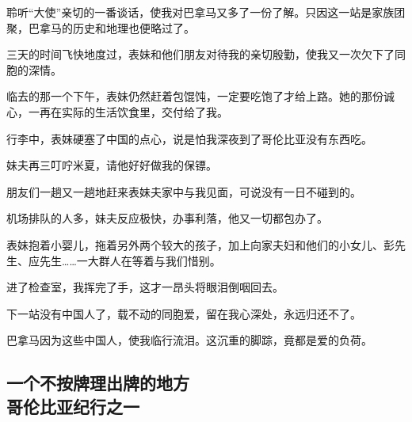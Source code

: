 \par 聆听“大使”亲切的一番谈话，使我对巴拿马又多了一份了解。只因这一站是家族团聚，巴拿马的历史和地理也便略过了。
\par 三天的时间飞快地度过，表妹和他们朋友对待我的亲切殷勤，使我又一次欠下了同胞的深情。
\par 临去的那一个下午，表妹仍然赶着包馄饨，一定要吃饱了才给上路。她的那份诚心，一再在实际的生活饮食里，交付给了我。
\par 行李中，表妹硬塞了中国的点心，说是怕我深夜到了哥伦比亚没有东西吃。
\par 妹夫再三叮咛米夏，请他好好做我的保镖。
\par 朋友们一趟又一趟地赶来表妹夫家中与我见面，可说没有一日不碰到的。
\par 机场排队的人多，妹夫反应极快，办事利落，他又一切都包办了。
\par 表妹抱着小婴儿，拖着另外两个较大的孩子，加上向家夫妇和他们的小女儿、彭先生、应先生……一大群人在等着与我们惜别。
\par 进了检查室，我挥完了手，这才一昂头将眼泪倒咽回去。
\par 下一站没有中国人了，载不动的同胞爱，留在我心深处，永远归还不了。
\par 巴拿马因为这些中国人，使我临行流泪。这沉重的脚踪，竟都是爱的负荷。


\subsection{一个不按牌理出牌的地方\\\small{哥伦比亚纪行之一}}

